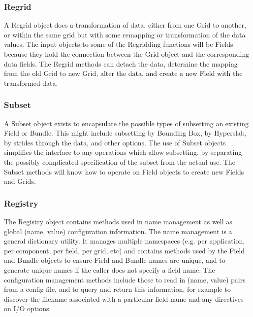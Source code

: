 \subsubsection{Regrid}

A Regrid object does a transformation of data, either from
one Grid to another, or within the same grid but with some remapping
or transformation of the data values.  The input objects to
some of the Regridding functions will be Fields because they
hold the connection between the Grid object and the corresponding
data fields.  The Regrid methods can detach the data, determine
the mapping from the old Grid to new Grid, alter the data, and
create a new Field with the transformed data.

\subsubsection{Subset}

A Subset object 
exists to encapsulate the possible types of subsetting an existing
Field or Bundle.  This might include subsetting by Bounding Box,
by Hyperslab, by strides through the data, and other options.
The use of Subset objects simplifies the interface to
any operations which allow subsetting, by separating the
possibly complicated specification of the subset from the
actual use.  The Subset methods will know how to operate on Field
objects to create new Fields and Grids.

\subsubsection{Registry}

The Registry object contains methods used in name management
as well as global (name, value) configuration information.
The name management is a general dictionary utility.  It
manages multiple namespaces (e.g. per application, per component,
per field, per grid, etc) and contains methods used by the
Field and Bundle objects to ensure Field and Bundle names
are unique, and to generate unique names if the caller does
not specify a field name.
The configuration management methods include those to 
read in (name, value) pairs from a config file, and to query
and return this information, for example to discover the
filename associated with a particular field name and
any directives on I/O options.


